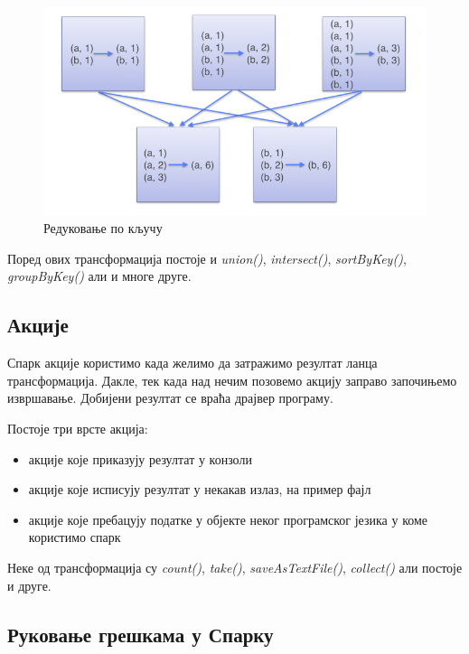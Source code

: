 \documentclass[12pt,oneside]{memoir}
\begin{document}
\begin{figure}[!ht]
  \centering
  \includegraphics[width=1\textwidth]{pictures/spark_reduce_by_key.png}
  \caption{Редуковање по кључу}
  \label{fig:sprk_red_by_key}
\end{figure}

Поред ових трансформација постоје и \textit{union()}, \textit{intersect()}, \textit{sortByKey()}, \textit{groupByKey()} али и многе друге. \cite{spark_rdd}

\subsection{Акције}
\label{subsec:spark_akc}

Спарк акције користимо када желимо да затражимо резултат ланца трансформација. Дакле, тек када над нечим позовемо акцију заправо започињемо извршавање. Добијени резултат се враћа драјвер програму. \cite{spark_guide}

Постоје три врсте акција:
\begin{itemize}
\item акције које приказују резултат у конзоли
\item акције које исписују резултат у некакав излаз, на пример фајл
\item акције које пребацују податке у објекте неког програмског језика у коме користимо спарк
\end{itemize}

Неке од трансформација су \textit{count()}, \textit{take()}, \textit{saveAsTextFile()}, \textit{collect()} али постоје и друге. \cite{spark_rdd}

\subsection{Руковање грешкама у Спарку}
\label{subsec:spark_dags}
\end{document}

